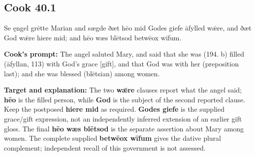 \par\begin{minipage}{\linewidth}\raggedright
\subsection*{Cook 40.1}

Se ęngel grētte Marian and sægde ðæt hēo mid Godes giefe āfylled wǣre, and ðæt God wǣre hiere mid; and hēo wæs blētsod betwēox wīfum.

\textbf{Cook's prompt:} The angel saluted Mary, and said that she was (194. b) filled (āfyllan, 113) with God’s grace [gift], and that God was with her (preposition last); and she was blessed (blētsian) among women.

\textbf{Target and explanation:} The two \textbf{wǣre} clauses report what the angel said; \textbf{hēo} is the filled person, while \textbf{God} is the subject of the second reported clause. Keep the postposed \textbf{hiere mid} as required. \textbf{Godes giefe} is the supplied grace/\allowbreak{}gift expression, not an independently inferred extension of an earlier gift gloss. The final \textbf{hēo wæs blētsod} is the separate assertion about Mary among women. The complete supplied \textbf{betwēox wīfum} gives the dative plural complement; independent recall of this government is not assessed.

\end{minipage}\par\addvspace{4pt}

